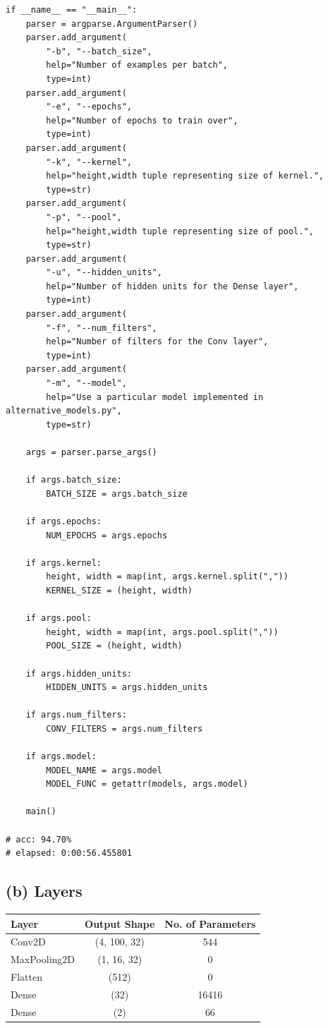 \documentclass{article}[11pt]
\newcommand\Tstrut{\rule{0pt}{2.4ex}}
\begin{document}
\begin{verbatim}
if __name__ == "__main__":
    parser = argparse.ArgumentParser()
    parser.add_argument(
        "-b", "--batch_size",
        help="Number of examples per batch",
        type=int)
    parser.add_argument(
        "-e", "--epochs",
        help="Number of epochs to train over",
        type=int)
    parser.add_argument(
        "-k", "--kernel",
        help="height,width tuple representing size of kernel.",
        type=str)
    parser.add_argument(
        "-p", "--pool",
        help="height,width tuple representing size of pool.",
        type=str)
    parser.add_argument(
        "-u", "--hidden_units",
        help="Number of hidden units for the Dense layer",
        type=int)
    parser.add_argument(
        "-f", "--num_filters",
        help="Number of filters for the Conv layer",
        type=int)
    parser.add_argument(
        "-m", "--model",
        help="Use a particular model implemented in alternative_models.py",
        type=str)

    args = parser.parse_args()

    if args.batch_size:
        BATCH_SIZE = args.batch_size

    if args.epochs:
        NUM_EPOCHS = args.epochs
    
    if args.kernel:
        height, width = map(int, args.kernel.split(","))
        KERNEL_SIZE = (height, width)

    if args.pool:
        height, width = map(int, args.pool.split(","))
        POOL_SIZE = (height, width)
    
    if args.hidden_units:
        HIDDEN_UNITS = args.hidden_units
    
    if args.num_filters:
        CONV_FILTERS = args.num_filters

    if args.model:
        MODEL_NAME = args.model
        MODEL_FUNC = getattr(models, args.model)

    main()

# acc: 94.70%
# elapsed: 0:00:56.455801
\end{verbatim}

\subsection*{(b) Layers}

\begin{center}
\begin{tabular}{l c c}
\hline
{\bf Layer} & {\bf Output Shape} & {\bf No. of Parameters} \Tstrut\\
\hline
Conv2D & (4, 100, 32) & 544\\
MaxPooling2D & (1, 16, 32) & 0\\
Flatten & (512) & 0\\
Dense & (32) & 16416\\
Dense & (2) & 66\\
\hline
\end{tabular}
\end{center}
\end{document}
